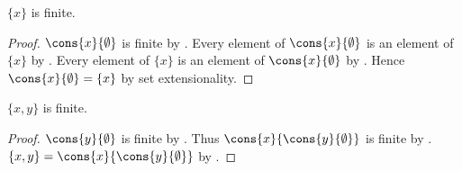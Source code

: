 \begin{corollary}\label{singleton_is_finite}
    $\{x\}$ is finite.
\end{corollary}
\begin{proof}
    $\cons{x}{\emptyset}$ is finite
        by .
    Every element of $\cons{x}{\emptyset}$ is an element of $\{x\}$
        by .
    Every element of $\{x\}$ is an element of $\cons{x}{\emptyset}$
        by .
    Hence $\cons{x}{\emptyset}=\{x\}$ by set extensionality.
\end{proof}

\begin{corollary}\label{pair_is_finite}
    $\{x,y\}$ is finite.
\end{corollary}
\begin{proof}
    $\cons{y}{\emptyset}$ is finite
        by .
    Thus $\cons{x}{\cons{y}{\emptyset}}$ is finite by .
    $\{x,y\}=\cons{x}{\cons{y}{\emptyset}}$
        by .
\end{proof}

